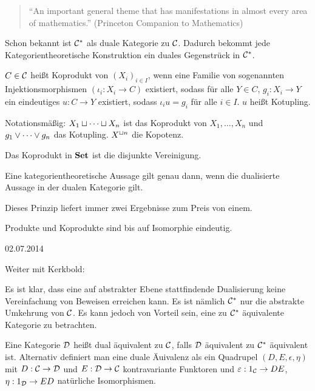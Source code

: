 \documentclass{book}
\begin{document}
\begin{quotation}
    ``An important general theme that has manifestations in almost every area of mathematics.'' (Princeton Companion to Mathematics)
\end{quotation}

Schon bekannt ist $\mathcal{C}^{\ast}$ als duale Kategorie zu $\mathcal{C}$. Dadurch bekommt jede Kategorientheoretische Konstruktion ein duales Gegenstrück in $\mathcal{C}^{\ast}$.

\begin{definition}
    $C\in\mathcal{C}$ heißt Koprodukt von ${(X_i)}_{i\in I}$, wenn eine Familie von sogenannten Injektionsmorphismen $(\iota_i:X_i\to C)$ existiert, sodass für alle $Y\in C$, $g_i:X_i\to Y$ ein eindeutiges $u:C\to Y$ existiert, sodass $\iota_i u = g_i$ für alle $i\in I$.
    $u$ heißt Kotupling.
\end{definition}

\begin{remark}
    Notationsmäßig: $X_1\mathbin{\sqcup}\cdots\mathbin{\sqcup} X_n$ ist das Koprodukt von $X_1,\ldots,X_n$ und $g_1\vee\cdots\vee g_n$ das Kotupling. $X^{\mathbin{\sqcup} n}$ die Kopotenz.
\end{remark}

\begin{example}
    Das Koprodukt in $\mathbf{Set}$ ist die disjunkte Vereinigung.
\end{example}

\begin{remark}
    Eine kategorientheoretische Aussage gilt genau dann, wenn die dualisierte Aussage in der dualen Kategorie gilt.
\end{remark}

Dieses Prinzip liefert immer zwei Ergebnisse zum Preis von einem.

\begin{example}
    Produkte und Koprodukte sind bis auf Isomorphie eindeutig.
\end{example}

\hfill{02.07.2014}

Weiter mit Kerkbold:

Es ist klar, dass eine auf abstrakter Ebene stattfindende Dualisierung keine Vereinfachung von Beweisen erreichen kann.
Es ist nämlich $\mathcal{C}^{\ast}$ nur die abstrakte Umkehrung von $\mathcal{C}$. Es kann jedoch von Vorteil sein, eine zu $\mathcal{C}^{\ast}$ äquivalente Kategorie zu betrachten.

\begin{definition}
    Eine Kategorie $\mathcal{D}$ heißt dual äquivalent zu $\mathcal{C}$, falls $\mathcal{D}$ äquivalent zu $\mathcal{C}^{\ast}$ äquivalent ist. Alternativ definiert man eine duale Äuivalenz als ein Quadrupel $(D,E,\epsilon,\eta)$ mit $D:\mathcal{C}\rightarrow\mathcal{D}$ und $E:\mathcal{D}\rightarrow\mathcal{C}$ kontravariante Funktoren und $\varepsilon : 1_{\mathcal{C}} \rightarrow DE $, $\eta : 1_{\mathcal{D}} \rightarrow ED $ natürliche Isomorphismen. 
\end{definition}
\end{document}
